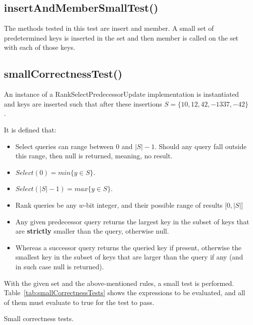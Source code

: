 \subsection{{\ttfamily insertAndMemberSmallTest()}}
The methods tested in this test are {\ttfamily insert} and {\ttfamily member}. A small set of predetermined keys is inserted in the set and then {\ttfamily member} is called on the set with each of those keys. 

\subsection{{\ttfamily smallCorrectnessTest()}}

An instance of a {\ttfamily RankSelectPredecessorUpdate} implementation is instantiated and keys are inserted such that after these insertions $S = \{10, 12, 42, -1337, -42\}$.

It is defined that:
\begin{itemize}
    \item Select queries can range between $0$ and $|S|-1$. Should any query fall outside this range, then {\ttfamily null} is returned, meaning, no result.
    \item $Select(0) = min\{y \in S \}$.
    \item $Select(|S|-1) = max\{y \in S\}$.
    \item Rank queries be any $w$-bit integer, and their possible range of results $\big[ 0, |S| \big]$
    \item Any given predecessor query returns the largest key in the subset of keys that are \textbf{strictly} smaller than the query, otherwise {\ttfamily null}.
    \item Whereas a successor query returns the queried key if present, otherwise the smallest key in the subset of keys that are larger than the query if any (and in such case {\ttfamily null} is returned).
\end{itemize}

With the given set and the above-mentioned rules, a small test is performed. Table~\ref{tab:smallCorrectnessTests} shows the expressions to be evaluated, and all of them must evaluate to {\ttfamily true} for the test to pass.

\begin{table}[H]
\centering

\caption[Small correctness tests]{Small correctness tests.}
\label{tab:smallCorrectnessTests}
\end{table}


